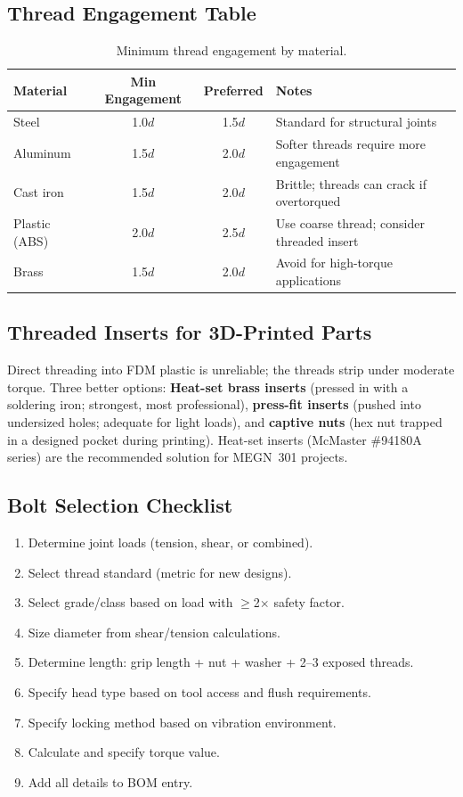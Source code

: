 \documentclass[11pt,letterpaper,twoside,openany]{book}
\begin{document}
\subsection{Thread Engagement Table}
\begin{table}[htbp]\centering\small
\begin{tabularx}{\textwidth}{l c c X}
\toprule
\textbf{Material} & \textbf{Min Engagement} & \textbf{Preferred} & \textbf{Notes} \\
\midrule
Steel & 1.0$d$ & 1.5$d$ & Standard for structural joints \\
Aluminum & 1.5$d$ & 2.0$d$ & Softer threads require more engagement \\
Cast iron & 1.5$d$ & 2.0$d$ & Brittle; threads can crack if overtorqued \\
Plastic (ABS) & 2.0$d$ & 2.5$d$ & Use coarse thread; consider threaded insert\index{threaded insert} \\
Brass & 1.5$d$ & 2.0$d$ & Avoid for high-torque applications \\
\bottomrule
\end{tabularx}
\caption{Minimum thread engagement by material.}
\end{table}

\subsection{Threaded Inserts for 3D-Printed Parts}
Direct threading into FDM plastic is unreliable; the threads strip under moderate torque. Three better options: \textbf{Heat-set brass inserts} (pressed in with a soldering iron; strongest, most professional), \textbf{press-fit inserts} (pushed into undersized holes; adequate for light loads), and \textbf{captive nuts} (hex nut trapped in a designed pocket during printing). Heat-set inserts (McMaster \#94180A series) are the recommended solution for MEGN~301 projects.

\subsection{Bolt Selection Checklist}
\begin{enumerate}[nosep,leftmargin=1.5em]
\item Determine joint loads (tension, shear, or combined).
\item Select thread standard (metric for new designs).
\item Select grade/class based on load with $\geq$2$\times$ safety factor.
\item Size diameter from shear/tension calculations.
\item Determine length: grip length + nut + washer + 2--3 exposed threads.
\item Specify head type based on tool access and flush requirements.
\item Specify locking method based on vibration environment.
\item Calculate and specify torque value.
\item Add all details to BOM entry.
\end{enumerate}
\end{document}
